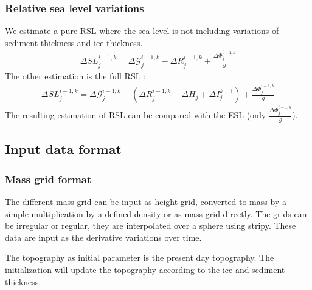 \documentclass[letterpaper,10pt,english]{sphinxmanual}
\begin{document}
\subsubsection{Relative sea level variations}
\label{\detokenize{numerical_imp:relative-sea-level-variations}}
\sphinxAtStartPar
We estimate a pure RSL where the sea level is not including variations of sediment thickness and ice thickness.
\begin{equation*}
\begin{split}\Delta SL^{i-1,k}_j = \Delta \mathcal{G}^{i-1,k}_j - \Delta R^{i-1,k}_j + \frac{\Delta \Phi ^{i-1,k}_j}{g}\end{split}
\end{equation*}
\sphinxAtStartPar
The other estimation is the full RSL :
\begin{equation*}
\begin{split}\Delta SL^{i-1,k}_j = \Delta \mathcal{G}^{i-1,k}_j - (\Delta R^{i-1,k}_j+\Delta H_j + \Delta I_j^{k-1}) + \frac{\Delta \Phi ^{i-1,k}_j}{g}\end{split}
\end{equation*}
\sphinxAtStartPar
The resulting estimation of RSL can be compared with the ESL (only \(\frac{\Delta \Phi ^{i-1,k}_j}{g}\)).


\subsection{Input data format}
\label{\detokenize{numerical_imp:input-data-format}}

\subsubsection{Mass grid format}
\label{\detokenize{numerical_imp:mass-grid-format}}\label{\detokenize{numerical_imp:grid-format}}
\sphinxAtStartPar
The different mass grid can be input as height grid, converted to mass by a simple multiplication by a defined density or as mass grid directly. The grids can be irregular or regular, they are interpolated over a sphere using stripy. These data are input as the derivative variations over time.

\sphinxAtStartPar
The topography as initial parameter is the present day topography. The initialization will update the topography according to the ice and sediment thickness.
\end{document}
